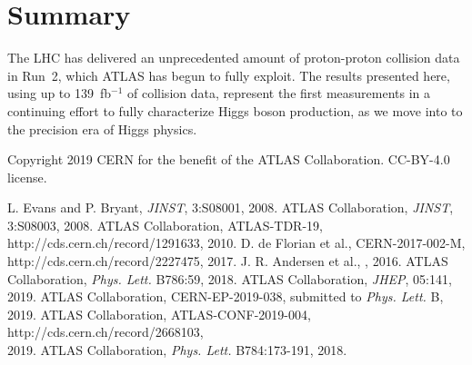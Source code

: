 \documentclass{moriond}
\def\tth{\ensuremath{t\bar{t}H}\xspace}
\begin{document}


\section{Summary}

The LHC has delivered an unprecedented amount of proton-proton collision data in Run~2, which ATLAS has begun to
fully exploit. The results presented here, using up to 139~fb$^{-1}$ of collision data,
represent the first measurements in a continuing effort to fully characterize Higgs boson production,
as we move into to the precision era of Higgs physics.

\phantom{.}

\noindent
Copyright 2019 CERN for the benefit of the ATLAS Collaboration. CC-BY-4.0 license.

\begin{thebibliography}{99}
 L. Evans and P. Bryant, {\em JINST}, 3:S08001, 2008.
 ATLAS Collaboration, {\em JINST}, 3:S08003, 2008.
 ATLAS Collaboration, ATLAS-TDR-19, http://cds.cern.ch/record/1291633, 2010.
 D. de Florian et al., CERN-2017-002-M, http://cds.cern.ch/record/2227475, 2017.
 J. R. Andersen et al., \href{http://arxiv.org/abs/1605.04692}{\color{black}{arXiv:1605.04692}}, 2016.
 ATLAS Collaboration, {\em Phys. Lett.} B786:59, 2018.
 ATLAS Collaboration, {\em JHEP}, 05:141, 2019.
 ATLAS Collaboration, CERN-EP-2019-038, submitted to {\em Phys. Lett.} B, 2019.
 ATLAS Collaboration, ATLAS-CONF-2019-004, http://cds.cern.ch/record/2668103,\\ 2019.
 ATLAS Collaboration, {\em Phys. Lett.} B784:173-191, 2018.
\end{thebibliography}


\end{document}
